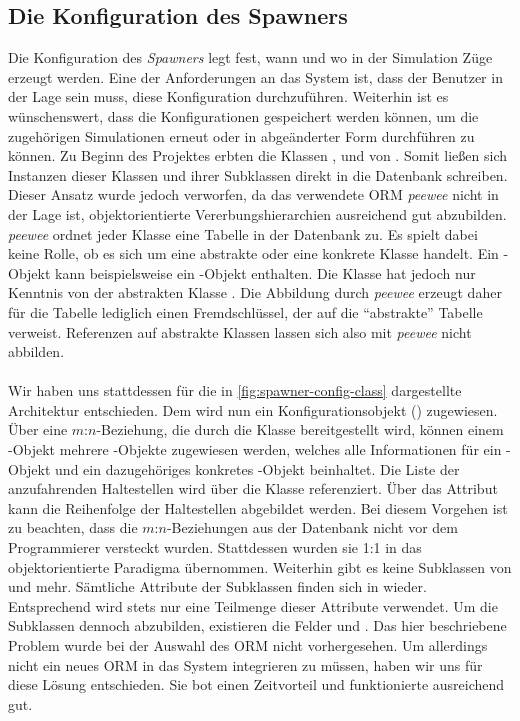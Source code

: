 \subsection{Die Konfiguration des Spawners}

Die Konfiguration des \emph{Spawners} legt fest, wann und wo in der Simulation Züge erzeugt werden. Eine der Anforderungen an das System ist, dass der Benutzer in der Lage sein muss, diese Konfiguration durchzuführen. Weiterhin ist es wünschenswert, dass die Konfigurationen gespeichert werden können, um die zugehörigen Simulationen erneut oder in abgeänderter Form durchführen zu können. Zu Beginn des Projektes erbten die Klassen ,  und  von . Somit ließen sich Instanzen dieser Klassen und ihrer Subklassen direkt in die Datenbank schreiben. Dieser Ansatz wurde jedoch verworfen, da das verwendete ORM \emph{peewee} nicht in der Lage ist, objektorientierte Vererbungshierarchien ausreichend gut abzubilden. \emph{peewee} ordnet jeder Klasse eine Tabelle in der Datenbank zu. Es spielt dabei keine Rolle, ob es sich um eine abstrakte oder eine konkrete Klasse handelt. Ein -Objekt kann beispielsweise ein -Objekt enthalten. Die Klasse  hat jedoch nur Kenntnis von der abstrakten Klasse . Die Abbildung durch \emph{peewee} erzeugt daher für die Tabelle  lediglich einen Fremdschlüssel, der auf die \enquote{abstrakte} Tabelle  verweist. Referenzen auf abstrakte Klassen lassen sich also mit \emph{peewee} nicht abbilden.\\
\\
Wir haben uns stattdessen für die in \autoref{fig:spawner-config-class} dargestellte Architektur entschieden. Dem  wird nun ein Konfigurationsobjekt () zugewiesen. Über eine $m$:$n$-Beziehung, die durch die Klasse  bereitgestellt wird, können einem -Objekt mehrere -Objekte zugewiesen werden, welches alle Informationen für ein -Objekt und ein dazugehöriges konkretes -Objekt beinhaltet. Die Liste der anzufahrenden Haltestellen wird über die Klasse  referenziert. Über das Attribut  kann die Reihenfolge der Haltestellen abgebildet werden. Bei diesem Vorgehen ist zu beachten, dass die $m$:$n$-Beziehungen aus der Datenbank nicht vor dem Programmierer versteckt wurden. Stattdessen wurden sie 1:1 in das objektorientierte Paradigma übernommen. Weiterhin gibt es keine Subklassen von  und  mehr. Sämtliche Attribute der Subklassen finden sich in  wieder. Entsprechend wird stets nur eine Teilmenge dieser Attribute verwendet. Um die Subklassen dennoch abzubilden, existieren die Felder  und . Das hier beschriebene Problem wurde bei der Auswahl des ORM nicht vorhergesehen. Um allerdings nicht ein neues ORM in das System integrieren zu müssen, haben wir uns für diese Lösung entschieden. Sie bot einen Zeitvorteil und funktionierte ausreichend gut.

